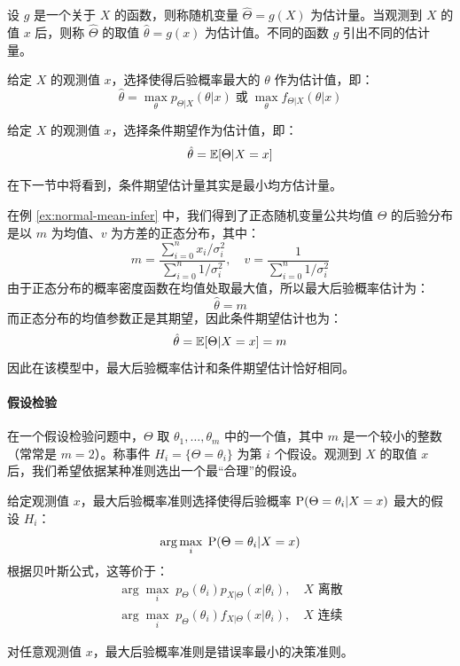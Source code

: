 \begin{definition}
设 $g$ 是一个关于 $X$ 的函数，则称随机变量 $\hat\Theta=g(X)$ 为估计量。当观测到 $X$ 的值 $x$ 后，则称 $\hat\Theta$ 的取值 $\hat\theta=g(x)$ 为估计值。不同的函数 $g$ 引出不同的估计量。
\end{definition}

\begin{definition}[最大后验概率估计量]
给定 $X$ 的观测值 $x$，选择使得后验概率最大的 $\theta$ 作为估计值，即：
\[
\hat\theta=\max_\theta p_{\Theta\vert X}(\theta\vert x)\;\text{或}\;\max_\theta f_{\Theta\vert X}(\theta\vert x)
\]
\end{definition}

\begin{definition}[条件期望估计量]
给定 $X$ 的观测值 $x$，选择条件期望作为估计值，即：
\[
\hat\theta=\mathbb{E}[\Theta\vert X=x]
\]
\end{definition}
\begin{com}
在下一节中将看到，条件期望估计量其实是最小均方估计量。
\end{com}

\begin{example}[正态随机变量公共均值的估计量]
\label{ex:normal-mean-estimate}
在例 \ref{ex:normal-mean-infer} 中，我们得到了正态随机变量公共均值 $\Theta$ 的后验分布是以 $m$ 为均值、$v$ 为方差的正态分布，其中：
\[
m=\frac{\sum_{i=0}^nx_i/\sigma_i^2}{\sum_{i=0}^n1/\sigma_i^2},\quad v=\frac{1}{\sum_{i=0}^n1/\sigma_i^2}
\]
由于正态分布的概率密度函数在均值处取最大值，所以最大后验概率估计为：
\[
\hat\theta=m
\]
而正态分布的均值参数正是其期望，因此条件期望估计也为：
\[
\hat\theta=\mathbb{E}[\Theta\vert X=x]=m
\]
因此在该模型中，最大后验概率估计和条件期望估计恰好相同。
\end{example}

\paragraph{假设检验}
在一个假设检验问题中，$\Theta$ 取 $\theta_1,\ldots,\theta_m$ 中的一个值，其中 $m$ 是一个较小的整数（常常是 $m=2$）。称事件 $H_i=\{\Theta=\theta_i\}$ 为第 $i$ 个假设。观测到 $X$ 的取值 $x$ 后，我们希望依据某种准则选出一个最“合理”的假设。

\begin{definition}[假设检验的最大后验概率准则]
给定观测值 $x$，最大后验概率准则选择使得后验概率 $\mathrm{P}(\Theta=\theta_i\vert X=x)$ 最大的假设 $H_i$：
\[
\arg\max_i\;\mathrm{P}(\Theta=\theta_i\vert X=x)
\]
根据贝叶斯公式，这等价于：
\begin{gather*}
    \arg\max_i\;p_\Theta(\theta_i)p_{X\vert\Theta}(x\vert\theta_i),\quad\text{$X$ 离散}\\
    \arg\max_i\;p_\Theta(\theta_i)f_{X\vert\Theta}(x\vert\theta_i),\quad\text{$X$ 连续}
\end{gather*}
\end{definition}
\begin{com}
对任意观测值 $x$，最大后验概率准则是错误率最小的决策准则。
\end{com}


